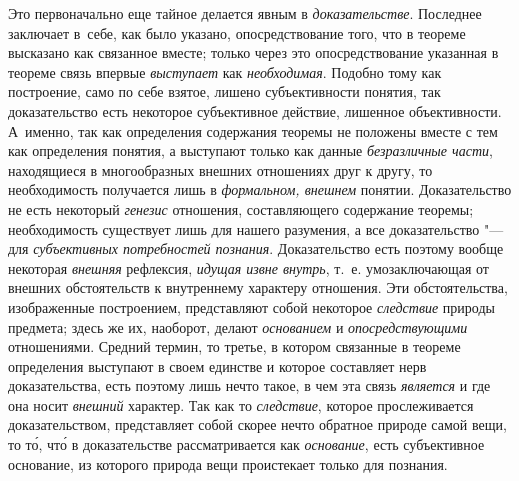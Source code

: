 Это первоначально еще тайное делается явным в
{\em доказательстве}.
Последнее заключает в~себе, как было указано,
опосредствование того, что в теореме высказано как связанное вместе; только
через это опосредствование указанная в теореме связь впервые
{\em выступает} как
{\em необходимая}.
Подобно тому как построение, само по себе взятое, лишено
субъективности понятия, так доказательство есть некоторое субъективное
действие, лишенное объективности. А~именно, так как определения содержания
теоремы не положены вместе с тем как определения понятия, а выступают
только как данные {\em безразличные
части}, находящиеся в многообразных внешних отношениях друг
к другу, то необходимость получается лишь в
{\em формальном, внешнем}
понятии. Доказательство не есть некоторый
{\em генезис} отношения,
составляющего содержание теоремы; необходимость существует лишь для нашего
разумения, а все доказательство "--- для
{\em субъективных потребностей
познания}. Доказательство есть поэтому вообще некоторая
{\em внешняя} рефлексия,
{\em идущая извне внутрь},
т.~е. умозаключающая от внешних обстоятельств к внутреннему
характеру отношения. Эти обстоятельства, изображенные построением,
представляют собой некоторое
{\em следствие} природы
предмета; здесь же их, наоборот, делают
{\em основанием} и
{\em опосредствующими}
отношениями. Средний термин, то третье, в котором связанные в
теореме определения выступают в своем единстве и которое составляет нерв
доказательства, есть поэтому лишь нечто такое, в чем эта связь
{\em является} и где она
носит {\em внешний}
характер. Так как то
{\em следствие}, которое
прослеживается доказательством, представляет собой скорее нечто обратное
природе самой вещи, то т\'{о}, чт\'{о} в доказательстве рассматривается как
{\em основание}, есть
субъективное основание, из которого природа вещи проистекает только для
познания.

